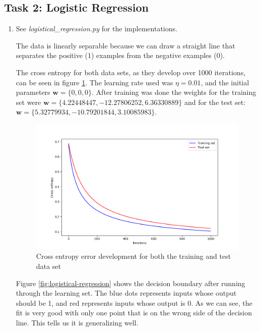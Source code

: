 \documentclass[a4paper]{article}
\begin{document}
\subsection*{Task 2: Logistic Regression}
    \begin{enumerate}
        \item
            See \emph{logistical\_regression.py} for the implementations.

            The data is linearly separable because we can draw a straight line
            that separates the positive (1) examples from the negative examples
            (0).

            The cross entropy for both data sets, as they develop over 1000 iterations, can be
            seen in figure \ref{fig:cross-entropy}. The learning rate used was $\eta = 0.01$, and 
            the initial parameters $\textbf{w} = \{0, 0, 0\}$. After training was done the weights
            for the training set were $\textbf{w} = \{4.22448447, -12.27806252, 6.36330889\}$ and for
            the test set: $\textbf{w} = \{5.32779934, -10.79201844, 3.10085983\}$.

            \begin{figure}[ht]
                \includegraphics[width=\linewidth]{cross_entropy.png}
                \caption{Cross entropy error development for both the training and test data set}
                \label{fig:cross-entropy}
            \end{figure}

            Figure \ref{fig:logistical-regression} shows the decision boundary
            after running through the learning set. The blue dots represents
            inputs whose output should be 1, and red represents inputs whose
            output is 0. As we can see, the fit is very good with only one point
            that is on the wrong side of the decision line. This tells us it is
            generalizing well.


\end{enumerate}
\end{document}
